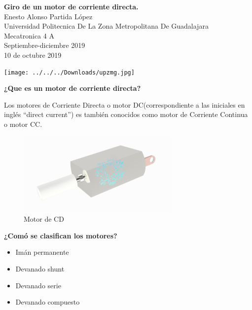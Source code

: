 \documentclass[12pt]{report}
\begin{document}
{\Large \textbf{Giro de un motor de corriente directa.}\\}
\Large{Enesto Alonso Partida López\\ Universidad Politecnica De La Zona Metropolitana De Guadalajara\\ Mecatronica 4 A\\ Septiembre-diciembre 2019}\\
{10 de octubre 2019 }\\

\begin{center}
\texttt{[image: ../../../Downloads/upzmg.jpg]} \\
\end{center}

\newpage
{\huge \textbf{¿Que es un motor de corriente directa?}\\}


{\Large Los motores de Corriente Directa o motor DC(correspondiente a las iniciales en inglés “direct current”) es también conocidos como motor de Corriente Continua o motor CC. }\\

\begin{figure}[hbtp]
\caption{Motor de CD}
\centering
\includegraphics[scale=0.5]{../EV_2_4_giro_de_un_motor_de_corriente_directa/motor+dc.png}
\end{figure}

{\huge \textbf{¿Comó se clasifican los motores?}\\}
\begin{itemize}
\item Imán permanente
\item Devanado shunt 
\item Devanado serie
\item Devanado compuesto 
\end{itemize}
\newpage
\end{document}
